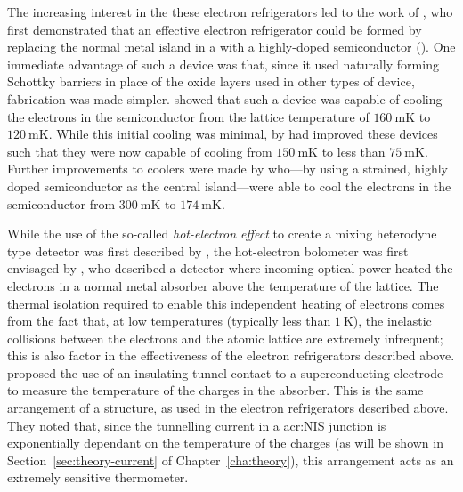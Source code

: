 The increasing interest in the these electron refrigerators led to the work of \textcite{Savin2001}, who first demonstrated that an effective electron refrigerator could be formed by replacing the normal metal island in a  with a highly-doped semiconductor (). One immediate advantage of such a device was that, since it used naturally forming Schottky barriers in place of the oxide layers used in other types of device, fabrication was made simpler. \citeauthor{Savin2001} showed that such a device was capable of cooling the electrons in the semiconductor from the lattice temperature of $160~\mathrm{mK}$ to $120~\mathrm{mK}$. While this initial cooling was minimal, by \citeyear{Savin2003} \citeauthor{Savin2003} had improved these devices such that they were now capable of cooling from $150~\mathrm{mK}$ to less than $75~\mathrm{mK}$. Further improvements to  coolers were made by \textcite{Prest2011} who---by using a strained, highly doped semiconductor as the central island---were able to cool the electrons in the semiconductor from $300~\mathrm{mK}$ to $174~\mathrm{mK}$.
\par 
While the use of the so-called \textit{hot-electron effect} to create a mixing heterodyne type detector was first described by \textcite{Arams1996}, the hot-electron bolometer was first envisaged by \textcite{Nahum1993}, who described a detector where incoming optical power heated the electrons in a normal metal absorber above the temperature of the lattice. The thermal isolation required to enable this independent heating of electrons comes from the fact that, at low temperatures (typically less than $1~\mathrm{K}$), the inelastic collisions between the electrons and the atomic lattice are extremely infrequent; this is also factor in the effectiveness of the electron refrigerators described above.  proposed the use of an insulating tunnel contact to a superconducting electrode to measure the temperature of the charges in the absorber. This is the same arrangement of a  structure, as used in the electron refrigerators described above. They noted that, since the tunnelling current in a \gls{acr:NIS} junction is exponentially dependant on the temperature of the charges (as will be shown in Section~\ref{sec:theory-current} of Chapter~\ref{cha:theory}), this arrangement acts as an extremely sensitive thermometer.
\par 
